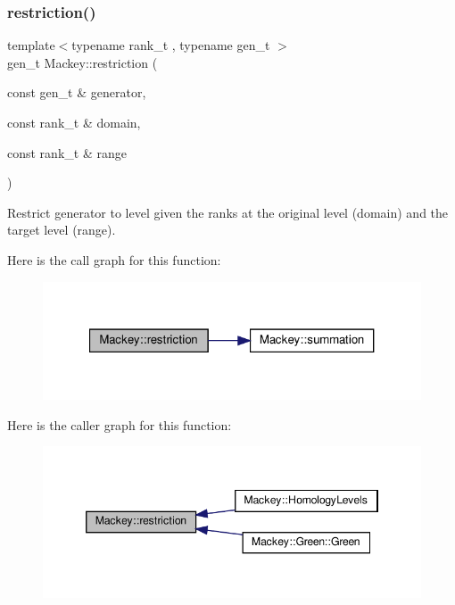 \subsubsection{\texorpdfstring{restriction()}{restriction()}}
{\footnotesize\ttfamily template$<$typename rank\+\_\+t , typename gen\+\_\+t $>$ \\
gen\+\_\+t Mackey\+::restriction (\begin{DoxyParamCaption}\item[{const gen\+\_\+t \&}]{generator,  }\item[{const rank\+\_\+t \&}]{domain,  }\item[{const rank\+\_\+t \&}]{range }\end{DoxyParamCaption})}



Restrict generator to level given the ranks at the original level (domain) and the target level (range). 

Here is the call graph for this function\+:\nopagebreak
\begin{figure}[H]
\begin{center}
\leavevmode
\includegraphics[width=321pt]{namespaceMackey_ad1e907ff76b07d4fc4c9d4bdf25918bd_cgraph}
\end{center}
\end{figure}
Here is the caller graph for this function\+:\nopagebreak
\begin{figure}[H]
\begin{center}
\leavevmode
\includegraphics[width=346pt]{namespaceMackey_ad1e907ff76b07d4fc4c9d4bdf25918bd_icgraph}
\end{center}
\end{figure}
\mbox{\label{namespaceMackey_a08fd3743ffb625fceca454da757dfa5d}} 
